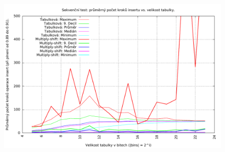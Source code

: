 \documentclass[12pt,a4paper]{report}
\begin{document}
	\begin{figure}[h]	
		\centering	
		\includegraphics[scale=0.6]{graph_seq_both}		
	\end{figure}
	
	\begin{figure}[h]	
		\centering
		\qquad
	\end{figure}
\end{document}

